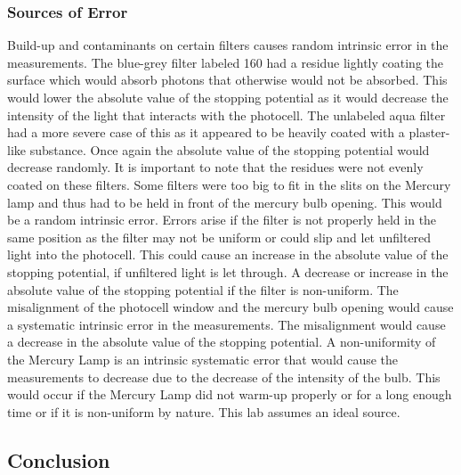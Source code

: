 \documentclass[a4paper]{article}
\begin{document}
\begin{table}[H]
\begin{center}
\begin{tabular}{|l|l|l|l|}
      \hline
    \end{tabular} 
  \end{center} 
  \label{tab:plancks}
\end{table}


\subsubsection{Sources of Error}

\qq Build-up and contaminants on certain filters causes random
intrinsic error in the measurements. The blue-grey filter labeled 160
had a residue lightly coating the surface which would absorb photons
that otherwise would not be absorbed. This would lower the absolute
value of the stopping potential as it would decrease the intensity of
the light that interacts with the photocell. The unlabeled aqua filter
had a more severe case of this as it appeared to be heavily coated
with a plaster-like substance. Once again the absolute value of the
stopping potential would decrease randomly. It is important to note
that the residues were not evenly coated on these filters. Some
filters were too big to fit in the slits on the Mercury lamp and thus
had to be held in front of the mercury bulb opening. This would be a
random intrinsic error. Errors arise if the filter is not properly
held in the same position as the filter may not be uniform or could
slip and let unfiltered light into the photocell. This could cause an
increase in the absolute value of the stopping potential, if
unfiltered light is let through. A decrease or increase in the
absolute value of the stopping potential if the filter is
non-uniform. The misalignment of the photocell window and the mercury
bulb opening would cause a systematic intrinsic error in the
measurements. The misalignment would cause a decrease in the absolute
value of the stopping potential. A non-uniformity of the Mercury Lamp
is an intrinsic systematic error that would cause the measurements to
decrease due to the decrease of the intensity of the bulb. This would
occur if the Mercury Lamp did not warm-up properly or for a long
enough time or if it is non-uniform by nature. This lab assumes an
ideal source.

\subsection{Conclusion}
\end{document}
